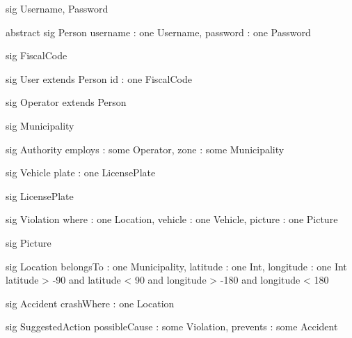 \begin{alloy}
sig Username, Password {}

abstract sig Person {
    username : one Username,
    password : one Password
}

sig FiscalCode{}

sig User extends Person {
    id : one FiscalCode
}

sig Operator extends Person {}

sig Municipality {}

sig Authority {
    employs : some Operator,
    zone : some Municipality
}

sig Vehicle {
    plate : one LicensePlate
}

sig LicensePlate {}

sig Violation {
    where : one Location,
    vehicle : one Vehicle,
    picture : one Picture
}

sig Picture{}

sig Location {
    belongsTo : one Municipality,
    latitude : one Int,
    longitude : one Int
}{
    latitude > -90 and latitude < 90 and
    longitude > -180 and longitude < 180
}

sig Accident{
    crashWhere : one Location
}

sig SuggestedAction {
    possibleCause : some Violation,
    prevents : some Accident
}
\end{alloy}